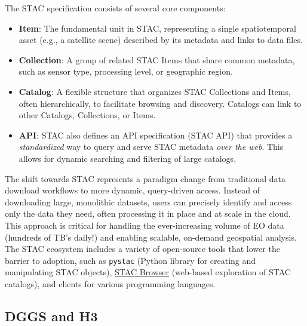 \begin{multicols}{2}
The STAC specification consists of several core components:
\begin{itemize}
    \item \textbf{Item}: The fundamental unit in STAC, representing a single spatiotemporal asset (e.g., a satellite scene) described by its metadata and links to data files.
    \item \textbf{Collection}: A group of related STAC Items that share common metadata, such as sensor type, processing level, or geographic region.
    \item \textbf{Catalog}: A flexible structure that organizes STAC Collections and Items, often hierarchically, to facilitate browsing and discovery. Catalogs can link to other Catalogs, Collections, or Items.
    \item \textbf{API}: STAC also defines an API specification (STAC API) that provides a \textit{standardized} way to query and serve STAC metadata \textit{over the web}. This allows for dynamic searching and filtering of large catalogs.
\end{itemize}

The shift towards STAC represents a paradigm change from traditional data download workflows to more dynamic, query-driven access. 
Instead of downloading large, monolithic datasets, users can precisely identify and access only the data they need, often processing it in place and at scale in the cloud.
This approach is critical for handling the ever-increasing volume of EO data (hundreds of TB's daily!) and enabling scalable, on-demand geospatial analysis. 
The STAC ecosystem includes a variety of open-source tools that lower the barrier to adoption, such as \texttt{pystac} (Python library for creating and manipulating STAC objects), 
\href{https://radiantearth.github.io/stac-browser/#/external/maxar-opendata.s3.amazonaws.com/events/catalog.json?.language=en}{STAC Browser} (web-based exploration of STAC catalogs), 
and clients for various programming languages.


\subsection{DGGS and H3}


\end{multicols}
